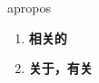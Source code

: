 
\begin{frame}
{\huge apropos}
\begin{center}
\begin{enumerate}\Large
  \item \textbf{相关的}
  \item \textbf{关于，有关}
\end{enumerate}
\end{center}
\end{frame}
